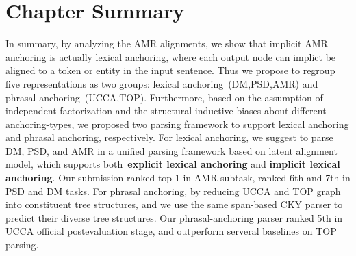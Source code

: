 \section{Chapter Summary}
\label{sec:conclusion}

In summary, by analyzing the AMR alignments, we show that implicit AMR
anchoring is actually lexical anchoring, where each output node can
implict be aligned to a token or entity in the input sentence. Thus we
propose to regroup five representations as two groups: lexical
anchoring~(DM,PSD,AMR) and phrasal anchoring~(UCCA,TOP). Furthermore,
based on the assumption of independent factorization and the
structural inductive biases about different anchoring-types, we
proposed two parsing framework to support lexical anchoring and phrasal
anchoring, respectively.  For lexical anchoring, we suggest to parse
DM, PSD, and AMR in a unified parsing framework based on latent
alignment model, which supports both~\textbf{explicit
  lexical anchoring} and \textbf{implicit lexical anchoring}. Our
submission ranked top 1 in AMR subtask, ranked 6th and 7th in PSD and
DM tasks. For phrasal anchoring, by reducing UCCA and TOP graph into
constituent tree structures, and we use the same span-based CKY parser
to predict their diverse tree structures. Our phrasal-anchoring parser
ranked 5th in UCCA official postevaluation stage, and outperform
serveral baselines on TOP parsing.

